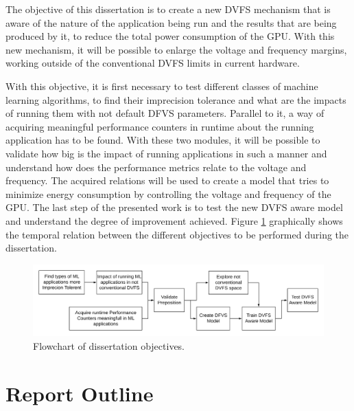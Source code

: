 The objective of this dissertation is to create a new DVFS mechanism that is aware of the nature of the application being run and the results that are being produced by it, to reduce the total power consumption of the GPU. With this new mechanism, it will be possible to enlarge the voltage and frequency margins, working outside of the conventional DVFS limits in current hardware. 

With this objective, it is first necessary to test different classes of machine learning algorithms, to find their imprecision tolerance and what are the impacts of running them with not default DFVS parameters. Parallel to it, a way of acquiring meaningful performance counters in runtime about the running application has to be found. With these two modules, it will be possible to validate how big is the impact of running applications in such a manner and understand how does the performance metrics relate to the voltage and frequency. The acquired relations will be used to create a model that tries to minimize energy consumption by controlling the voltage and frequency of the GPU. The last step of the presented work is to test the new DVFS aware model and understand the degree of improvement achieved. Figure \ref{fig:thesisObj} graphically shows the temporal relation between the different objectives to be performed during the dissertation.

\begin{figure}[!htb]
  \centering
  \includegraphics[width=1\textwidth]{Figures/Introduction/Dissertation_Objectives.png}
  \caption{Flowchart of dissertation objectives.}
  \label{fig:thesisObj}
\end{figure}

\section{Report Outline}